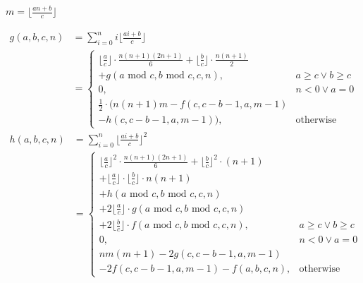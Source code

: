 $m = \lfloor\frac{an + b}{c}\rfloor$

$$ \begin{aligned}
  g(a, b, c, n) &= \sum_{i = 0}^{n}i\lfloor\frac{ai + b}{c}\rfloor \\
  &= \begin{cases}
    \lfloor{\frac{a}{c}}\rfloor \cdot \frac{n(n + 1)(2n + 1)}{6} + \lfloor\frac{b}{c}\rfloor \cdot \frac{n(n + 1)}{2} \\ + g(a\text{ mod } c, b\text{ mod } c, c, n), & a \geq c \lor b \geq c \\
    0, & n < 0 \lor a = 0 \\
    \frac{1}{2} \cdot (n(n + 1)m - f(c, c - b - 1, a, m - 1) \\ - h(c, c - b - 1, a, m - 1)), & \text{otherwise}
  \end{cases}
\end{aligned} $$
$$ \begin{aligned}
  h(a, b, c, n) &= \sum_{i = 0}^{n}\lfloor\frac{ai + b}{c}\rfloor^2 \\
  &= \begin{cases}
    \lfloor\frac{a}{c}\rfloor^2 \cdot \frac{n(n + 1)(2n + 1)}{6} + \lfloor\frac{b}{c}\rfloor^2 \cdot (n + 1) \\ + \lfloor\frac{a}{c}\rfloor \cdot \lfloor\frac{b}{c}\rfloor \cdot n(n + 1) \\ + h(a\text{ mod } c, b\text{ mod } c, c, n) \\ + 2\lfloor\frac{a}{c}\rfloor \cdot g(a\text{ mod } c, b\text{ mod } c, c, n) \\ + 2\lfloor\frac{b}{c}\rfloor \cdot f(a\text{ mod } c, b\text{ mod } c, c, n), & a \geq c \lor b \geq c \\
    0, & n < 0 \lor a = 0 \\
    nm(m + 1) - 2g(c, c - b - 1, a, m - 1) \\ - 2f(c, c - b - 1, a, m - 1) - f(a, b, c, n), & \text{otherwise}
  \end{cases}
\end{aligned} $$

